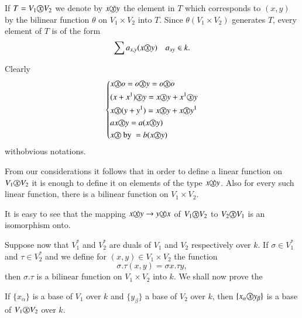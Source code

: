 If $T = V_1  \text{\textcircled{$x$}} V_2$ we denote by $x \text{\textcircled{$x$}}
y$ the element in $T$ which corresponds to $(x,y)$ by the bilinear
function $\theta$ on $V_1 \times V_2$ into $T$. Since $\theta ( V_1 \times
 V_2)$ generates $T$, every element of $T$ is of the form 
$$
\sum a_{x,y}  (x  \text{\textcircled{$x$}}  y) \quad a_{xy}  \in  k.
$$

Clearly
\begin{equation*}
\left \{
\begin{aligned}
& x  \text{\textcircled{$x$}}  o = o  \text{\textcircled{$x$}}  y = o 
  \text{\textcircled{$x$}}  o\\ 
& (x + x^1)  \text{\textcircled{$x$}}  y = x  \text{\textcircled{$x$}}  y + x^1 
  \text{\textcircled{$x$}}  y \\ 
& x  \text{\textcircled{$x$}} (y + y^1) = x  \text{\textcircled{$x$}} y + x
  \text{\textcircled{$x$}}  y^1 \\ 
& ax \text{\textcircled{$x$}}  y = a (x  \text{\textcircled{$x$}}  y)\\ 
& x  \text{\textcircled{$x$}}  \text{ by } = b (x  \text{\textcircled{$x$}}  y) 
\end{aligned}
\right.
\end{equation*}
with\pageoriginale obvious notations.

From our considerations it follows that in order to define a linear
function on $V_1 \text{\textcircled{$x$}}  V_2$ it is enough to define it on
elements of the type $x  \text{\textcircled{$x$}}  y$. Also for every such
linear function, there is a bilinear function on $V_1 \times V_2$. 

It is easy to see that the mapping $x  \text{\textcircled{$x$}}  y
\rightarrow y \text{\textcircled{$x$}}  x$ of $V_1  \text{\textcircled{$x$}}  V_2$
to $V_2 \text{\textcircled{$x$}}  V_1$ is an isomorphism onto. 

Suppose now that $V^*_1$ and $V^*_2$ are duals of $V_1$ and $V_2$
respectively over $k$. If $\sigma  \in  V^*_{1}$ and $\tau \in 
V_2^*$ and we define for $(x,y)  \in  V_{1}  \times  V_{2}$ the
function  
$$
\sigma.\tau(x,y) = \sigma x . \tau y, 
$$
then $\sigma.\tau$ is a bilinear function on $V_1 \times  V_2$ into
$k$. We shall now prove the  

\begin{thm}\label{c5:thm3}%
If $\{x_\alpha \}$ is a base of $V_1$ over $k$ and $\{y_\beta \}$
  a base of $V_2$ over $k$, then $\{x_\alpha \text{\textcircled{$x$}} 
  y_\beta \}$ is a base of $V_1 \text{\textcircled{$x$}} V_2$ over $k$. 
\end{thm}

